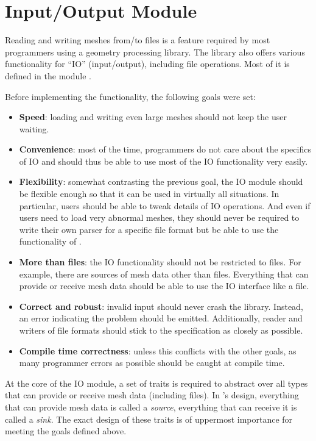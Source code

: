 \newpage
\section{Input/Output Module}

Reading and writing meshes from/to files is a feature required by most programmers using a geometry processing library.
The library  also offers various functionality for \enquote{IO} (input/output), including file operations.
Most of it is defined in the module .

Before implementing the functionality, the following goals were set:

\begin{itemize}
  \item \textbf{Speed}: loading and writing even large meshes should not keep the user waiting.
  \item \textbf{Convenience}: most of the time, programmers do not care about the specifics of IO and should thus be able to use most of the IO functionality very easily.
  \item \textbf{Flexibility}: somewhat contrasting the previous goal, the IO module should be flexible enough so that it can be used in virtually all situations.
  In particular, users should be able to tweak details of IO operations.
  And even if users need to load very abnormal meshes, they should never be required to write their own parser for a specific file format but be able to use the functionality of .
  \item \textbf{More than files}: the IO functionality should not be restricted to files.
  For example, there are sources of mesh data other than files.
  Everything that can provide or receive mesh data should be able to use the IO interface like a file.
  \item \textbf{Correct and robust}: invalid input should never crash the library.
  Instead, an error indicating the problem should be emitted.
  Additionally, reader and writers of file formats should stick to the specification as closely as possible.
  \item \textbf{Compile time correctness}: unless this conflicts with the other goals, as many programmer errors as possible should be caught at compile time.
\end{itemize}

\vfill
At the core of the IO module, a set of traits is required to abstract over all types that can provide or receive mesh data (including files).
In 's design, everything that can provide mesh data is called a \emph{source}, everything that can receive it is called a \emph{sink}.
The exact design of these traits is of uppermost importance for meeting the goals defined above.

